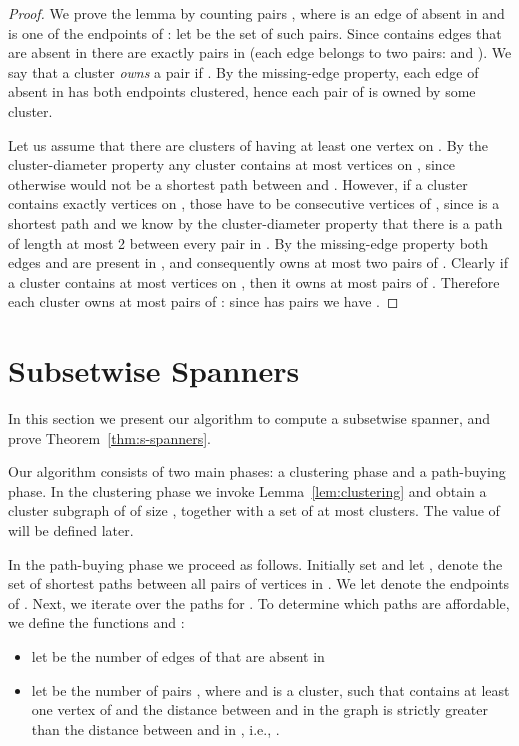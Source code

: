 \documentclass[a4paper,11pt]{article}
\theoremstyle{definition}
\begin{document}
\begin{proof}
We prove the lemma by counting pairs , where  is an edge of 
absent in  and  is one of the endpoints of : let  be the set of such pairs.
Since  contains  edges that are absent in  there are exactly 
pairs in  (each edge  belongs to two pairs: 
 and ).
We say that a cluster  {\em owns} a pair  if .
By the missing-edge property, each edge  of  absent in  has both endpoints clustered,
hence each pair of  is owned by some cluster.

Let us assume that there are  clusters of  having
at least one vertex on .
By the cluster-diameter property any cluster  contains at most  vertices on ,
since otherwise  would not be a shortest path between  and .
However, if a cluster  contains exactly  vertices on ,
those have to be consecutive vertices  of , since  is a shortest path and we know by the cluster-diameter property that there is a path of length at most 2 between every 
pair in . By the missing-edge property
both edges  and  are present in , and consequently 
owns at most two pairs of .
Clearly if a cluster  contains at most  vertices on ,
then it owns at most  pairs of .
Therefore each cluster owns at most  pairs of :  
since  has  pairs we have .
\end{proof}

\section{Subsetwise Spanners}
\label{section-s-spanners}

In this section we present our algorithm to compute a subsetwise spanner, and prove Theorem~\ref{thm:s-spanners}. 

Our algorithm 
consists of two main phases: a clustering phase and a path-buying phase. In the clustering phase we invoke Lemma~\ref{lem:clustering} 
and obtain a cluster subgraph  of  of size ,
together with a set  of at most  clusters. The value of  will be defined later.

In the path-buying phase we proceed as follows. 
Initially set  and let ,  denote
the set of  shortest paths between all pairs of vertices in . We let  denote the endpoints of .
Next, we iterate over the paths  for . 
To determine which paths are affordable, we define the functions 
and :
\begin{itemize}
\item let  be the number of edges of  that are absent in 
\item let  be the number of pairs , where  and 
 is a cluster, such that  contains at least one vertex of 
and the distance between  and  in the graph 
is strictly greater than the distance between  and  in , 
i.e., .
\end{itemize}
\end{document}
